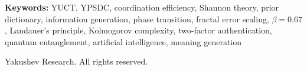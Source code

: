\documentclass[12pt,a4paper]{article}
\theoremstyle{remark}
\begin{document}
\begin{titlepage}
\begin{center}
			\vspace{1cm}
			
			\noindent
			\small\textbf{Keywords:} YUCT, YPSDC, coordination efficiency, Shannon theory, prior dictionary, information generation, phase transition, fractal error scaling, $\beta=0.67$, Landauer's principle, Kolmogorov complexity, two‑factor authentication, quantum entanglement, artificial intelligence, meaning generation
			
			\vspace{0.5cm}
			
			\noindent
			 Yakushev Research. All rights reserved.
		\end{center}
	\end{titlepage}
	
	\tableofcontents
	\newpage
	
\end{document}
